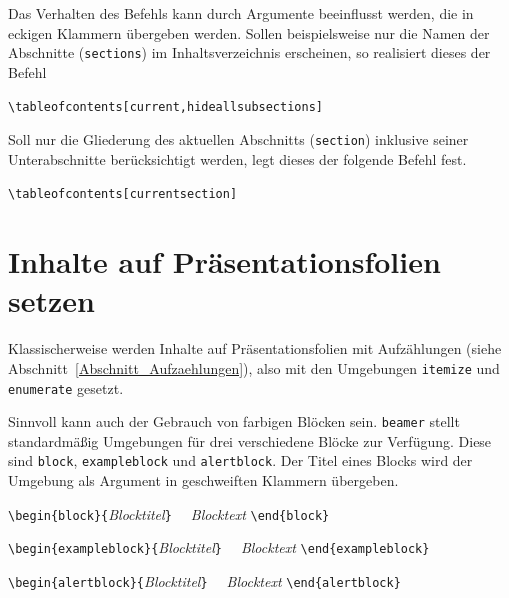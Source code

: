 \documentclass[a4paper,10pt,twoside]{scrbook}
\begin{document}
{Das Verhalten des Befehls kann durch Argumente beeinflusst werden, die in eckigen Klammern übergeben werden.
Sollen beispielsweise nur die Namen der Abschnitte (\verb|sections|) im Inhaltsverzeichnis erscheinen, so realisiert dieses 
der Befehl 

\verb|\tableofcontents[current,hideallsubsections]|

Soll nur die Gliederung des aktuellen Abschnitts (\verb|section|) inklusive seiner Unterabschnitte berücksichtigt werden, 
legt dieses der folgende Befehl fest.

\verb|\tableofcontents[currentsection]|

\section{Inhalte auf Präsentationsfolien setzen}

Klassischerweise werden Inhalte auf Präsentationsfolien mit 
Aufzählungen (siehe Abschnitt~\ref{Abschnitt_Aufzaehlungen}), also mit den Umgebungen \verb!itemize! und \verb!enumerate! gesetzt. 

Sinnvoll kann auch der Gebrauch von farbigen Blöcken sein.
\verb|beamer| stellt standardmäßig Umgebungen für drei verschiedene Blöcke zur Verfügung. Diese sind
\verb|block|, 
\verb|exampleblock| und 
\verb|alertblock|. Der Titel eines Blocks 
wird der Umgebung als Argument in geschweiften Klammern übergeben.


\begin{boxedminipage}{\textwidth}
	\verb!\begin{block}{!\textsl{Blocktitel}\verb!}! \newline
	\verb!  !\textsl{Blocktext} \newline
	\verb!\end{block}! \\\enskip
	
	\verb!\begin{exampleblock}{!\textsl{Blocktitel}\verb!}! \newline
    \verb!  !\textsl{Blocktext} \newline
    \verb!\end{exampleblock}! \\\enskip

	\verb!\begin{alertblock}{!\textsl{Blocktitel}\verb!}! \newline
    \verb!  !\textsl{Blocktext} \newline
    \verb!\end{alertblock}!
\end{boxedminipage}


}
\end{document}
